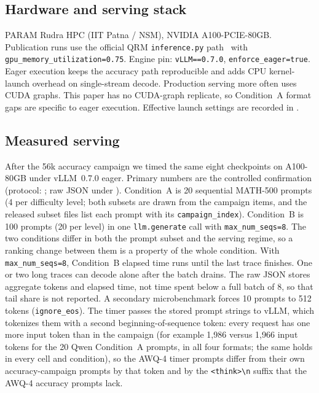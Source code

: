 \documentclass[11pt,a4paper]{article}
\begin{document}
\subsection{Hardware and serving stack}
PARAM Rudra HPC (IIT Patna / NSM), NVIDIA A100-PCIE-80GB. Publication runs use the official QRM \texttt{inference.py} path~\cite{liu2025qrm} with \texttt{gpu\_memory\_utilization=0.75}. Engine pin: \texttt{vLLM==0.7.0}, \texttt{enforce\_eager=true}. Eager execution keeps the accuracy path reproducible and adds CPU kernel-launch overhead on single-stream decode. Production serving more often uses CUDA graphs. This paper has no CUDA-graph replicate, so Condition~A format gaps are specific to eager execution. Effective launch settings are recorded in .

\subsection{Measured serving}
\label{sec:measured-serving}
After the 56k accuracy campaign we timed the same eight checkpoints on A100-80GB under vLLM~0.7.0 eager. Primary numbers are the controlled confirmation (protocol: ; raw JSON under ). Condition~A is 20 sequential MATH-500 prompts (4 per difficulty level; both subsets are drawn from the campaign items, and the released subset files list each prompt with its \texttt{campaign\_index}). Condition~B is 100 prompts (20 per level) in one \texttt{llm.generate} call with \texttt{max\_num\_seqs=8}. The two conditions differ in both the prompt subset and the serving regime, so a ranking change between them is a property of the whole condition. With \texttt{max\_num\_seqs=8}, Condition~B elapsed time runs until the last trace finishes. One or two long traces can decode alone after the batch drains. The raw JSON stores aggregate tokens and elapsed time, not time spent below a full batch of 8, so that tail share is not reported. A secondary microbenchmark forces 10 prompts to 512 tokens (\texttt{ignore\_eos}). The timer passes the stored prompt strings to vLLM, which tokenizes them with a second beginning-of-sequence token: every request has one more input token than in the campaign (for example 1{,}986 versus 1{,}966 input tokens for the 20 Qwen Condition~A prompts, in all four formats; the same holds in every cell and condition), so the AWQ-4 timer prompts differ from their own accuracy-campaign prompts by that token and by the \texttt{<think>\textbackslash n} suffix that the AWQ-4 accuracy prompts lack.
\end{document}

